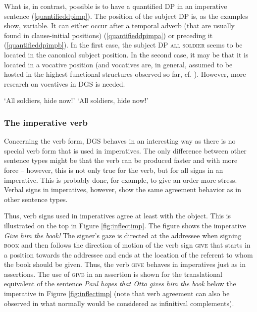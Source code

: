 \noindent What is, in contrast, possible is to have a quantified DP in an imperative sentence (\ref{quantifieddpimp}). The position of the subject DP is, as the examples show, variable. It can either occur after a temporal adverb (that are usually found in clause-initial positions) (\ref{quantifieddpimpa}) or preceding it (\ref{quantifieddpimpb}). In the first case, the subject DP \textsc{all soldier} seems to be located in the canonical subject position. In the second case, it may be that it is located in a vocative position (and vocatives are, in general, assumed to be hosted in the highest functional structures observed so far, cf. \citealt{moro2003notes, hill2007vocatives, hill2013vocatives}). However, more research on vocatives in DGS is needed.

\begin{exe}
\ex\label{quantifieddpimp}\begin{xlist}
\ex {}
%
\glt `All soldiers, hide now!' \label{quantifieddpimpa}
\ex {}
%
\glt `All soldiers, hide now!' \label{quantifieddpimpb}
\end{xlist}
\end{exe}

\subsubsection{The imperative verb}
\noindent Concerning the verb form, DGS behaves in an interesting way as there is no special verb form that is used in imperatives. The only difference between other sentence types might be that the verb can be produced  faster and with more force -- however, this is not only true for the verb, but for all signs in an imperative. This is probably done, for example, to give an order more stress. Verbal signs in imperatives, however, show the same agreement behavior as in other sentence types.

Thus, verb signs used in imperatives agree at least with the object. This is illustrated on the top in Figure \ref{fig:inflectimp}. The figure shows the imperative \textit{Give him the book!} The signer's gaze is directed at the addressee when signing \textsc{book} and then follows the direction of motion of the verb sign \textsc{give} that starts in a position towards the addressee and ends at the location of the referent to whom the book should be given. Thus, the verb \textsc{give} behaves in imperatives just as in assertions. The use of \textsc{give} in an assertion is shown for the translational equivalent of the sentence \textit{Paul hopes that Otto gives him the book} below the imperative in Figure \ref{fig:inflectimp} (note that verb agreement can also be observed in what normally would be considered as infinitival complements).


